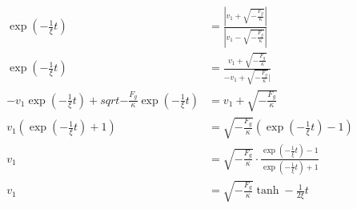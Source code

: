 \documentclass[sectionformat = aufgabe]{gadsescript}
\begin{document}
\begin{enumerate}[label=\alph*)]
		\begin{align*}
			\exp\left(- \frac{1}{\xi} t\right) &= \frac{| v_1 + \sqrt{-\frac{F_g}{\kappa}}|}{| v_1 - \sqrt{-\frac{F_g}{\kappa}}|}\\
			\exp\left(- \frac{1}{\xi} t\right) &= \frac{ v_1 + \sqrt{-\frac{F_g}{\kappa}}}{ - v_1 + \sqrt{-\frac{F_g}{\kappa}}|}\\
			-v_1 \exp\left(- \frac{1}{\xi} t\right) + sqrt{- \frac{F_g}{\kappa}} \exp\left(-\frac{1}{\xi}t\right) &= v_1 + \sqrt{-\frac{F_g}{\kappa}}\\
			v_1 \left(\exp\left(- \frac{1}{\xi} t\right) + 1\right) &= \sqrt{-\frac{F_g}{\kappa}} \left(\exp\left(-\frac{1}{\xi}t\right) - 1 \right)\\
			v_1 &= \sqrt{-\frac{F_g}{\kappa}} \cdot \frac{\exp\left(-\frac{1}{\xi}t\right) - 1 }{\exp\left(- \frac{1}{\xi} t\right) + 1} \\
			v_1 &= \sqrt{-\frac{F_g}{\kappa}} \tanh-\frac{1}{2\xi} t
		\end{align*}
\end{enumerate}
\end{document}
